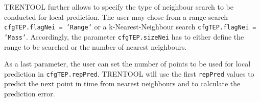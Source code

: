 \documentclass[a4paper,10pt]{article}
\begin{document}
TRENTOOL further allows to specify the type of neighbour search to be conducted for local prediction. The user may chose from a range search \texttt{cfgTEP.flagNei = 'Range'} or a k-Nearest-Neighbour search \texttt{cfgTEP.flagNei = 'Mass'}. Accordingly, the parameter  \texttt{cfgTEP.sizeNei} has to either define the range to be searched or the number of nearest neighbours. 

As a last parameter, the user can set the number of points to be used for local prediction in \texttt{cfgTEP.repPred}. TRENTOOL will use the first \texttt{repPred} values to predict the next point in time from nearest neighbours and to calculate the prediction error.







\end{document}
